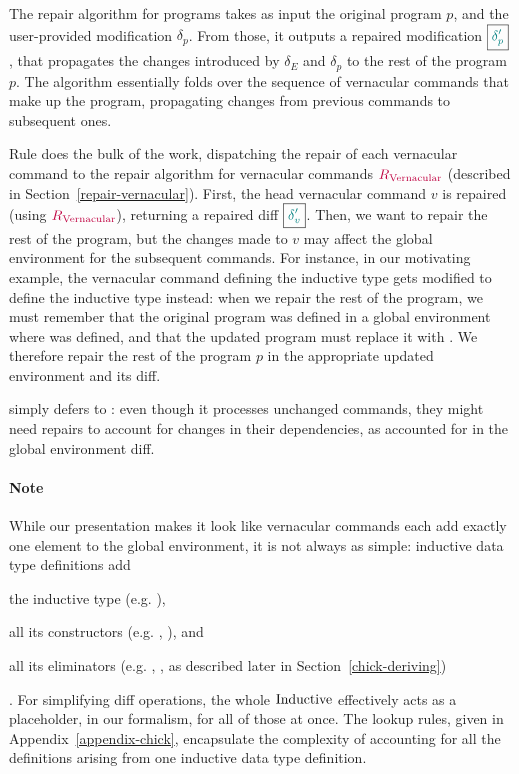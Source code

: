

The repair algorithm for programs takes as input the original program $p$, and
the user-provided modification $\delta_p$.  From those, it outputs a repaired
modification $\boxed{ \textcolor{teal}{\delta_p'} }$, that propagates the changes introduced by
$\delta_E$ and $\delta_p$ to the rest of the program $p$.  The algorithm
essentially folds over the sequence of vernacular commands that make up the
program, propagating changes from previous commands to subsequent ones.

Rule  does the bulk of the work, dispatching the repair of
each vernacular command to the repair algorithm for vernacular commands
$\textcolor{purple}{R_{\text{Vernacular}}}$ (described in Section~\ref{repair-vernacular}).  First, the
head vernacular command $v$ is repaired (using $\textcolor{purple}{R_{\text{Vernacular}}}$), returning a
repaired diff $\boxed{ \textcolor{teal}{\delta_v'} }$.  Then, we want to repair the rest of the
program, but the changes made to $v$ may affect the global environment for the
subsequent commands.  For instance, in our motivating example, the vernacular
command defining the inductive type  gets modified to define the
inductive type  instead: when we repair the rest of the program,
we must remember that the original program was defined in a global environment
where  was defined, and that the updated program must replace it
with .  We therefore repair the rest of the program $p$ in the
appropriate updated environment and its diff.

 simply defers to : even though it
processes unchanged commands, they might need repairs to account for changes in
their dependencies, as accounted for in the global environment diff.


\paragraph{Note} While our presentation makes it look like vernacular commands
each add exactly one element to the global environment, it is not always as
simple: inductive data type definitions add \begin{enumerate*} \item the
inductive type (e.g. ), \item all its constructors
(e.g. , ), and \item all its eliminators
(e.g. , , as described later in
Section~\ref{chick-deriving}) \end{enumerate*}.  For simplifying diff
operations, the whole $\text{Inductive}$ effectively acts as a placeholder, in our
formalism, for all of those at once.  The lookup rules, given in
Appendix~\ref{appendix-chick}, encapsulate the complexity of accounting for all
the definitions arising from one inductive data type definition.

